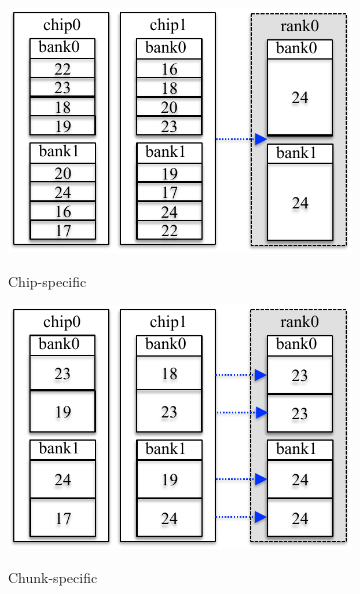\begin{figure}
 \centering
  \begin{subfigure}{.32\textwidth}
    \centering
    	\includegraphics[width=\linewidth]{figures/default.pdf}\\
    \caption{Chip-specific}
    \label{fig:chip_default}
  \end{subfigure}
%
  \begin{subfigure}{.32\textwidth}
    \centering
    	\includegraphics[width=\linewidth]{figures/chunk_unsort.pdf}\\
    \caption{Chunk-specific}
    \label{fig:chunk_unsort}
  \end{subfigure}
  \begin{subfigure}{.32\textwidth}
    \centering

\end{subfigure}
\end{figure}
